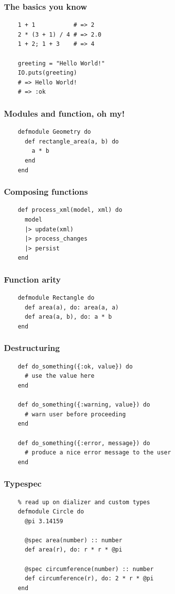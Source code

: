 \documentclass{beamer}
\begin{document}
\begin{frame}[fragile]
  \frametitle{The basics you know}
  \begin{lstlisting}
    1 + 1           # => 2
    2 * (3 + 1) / 4 # => 2.0
    1 + 2; 1 + 3    # => 4

    greeting = "Hello World!"
    IO.puts(greeting)
    # => Hello World!
    # => :ok
  \end{lstlisting}
\end{frame}

\begin{frame}[fragile]
  \frametitle{Modules and function, oh my!}
  \begin{lstlisting}
    defmodule Geometry do
      def rectangle_area(a, b) do
        a * b
      end
    end
  \end{lstlisting}
\end{frame}

\begin{frame}[fragile]
  \frametitle{Composing functions}
  \begin{lstlisting}
    def process_xml(model, xml) do
      model
      |> update(xml)
      |> process_changes
      |> persist
    end
  \end{lstlisting}
\end{frame}

\begin{frame}[fragile]
  \frametitle{Function arity}
  \begin{lstlisting}
    defmodule Rectangle do
      def area(a), do: area(a, a)
      def area(a, b), do: a * b
    end
  \end{lstlisting}
\end{frame}

\begin{frame}[fragile]
  \frametitle{Destructuring}
  \begin{lstlisting}
    def do_something({:ok, value}) do
      # use the value here
    end

    def do_something({:warning, value}) do
      # warn user before proceeding
    end

    def do_something({:error, message}) do
      # produce a nice error message to the user
    end
  \end{lstlisting}
\end{frame}

\begin{frame}[fragile]
  \frametitle{Typespec}
  \begin{lstlisting}
    % read up on dializer and custom types
    defmodule Circle do
      @pi 3.14159

      @spec area(number) :: number
      def area(r), do: r * r * @pi
        
      @spec circumference(number) :: number
      def circumference(r), do: 2 * r * @pi
    end
  \end{lstlisting}
\end{frame}
\end{document}
